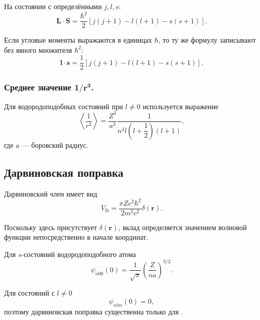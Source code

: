 \documentclass[../final.tex]{subfiles}
\begin{document}
На состоянии с определёнными $j,l,s$:
%
\begin{equation*}
    \mathbf L\cdot\mathbf S
    =
    \frac{\hbar^2}{2}
    \left[
        j(j+1)
        -
        l(l+1)
        -
        s(s+1)
    \right].
\end{equation*}

Если угловые моменты выражаются в единицах $\hbar$, то ту же формулу
записывают без явного множителя $\hbar^2$:
%
\begin{equation*}
    \mathbf l\cdot\mathbf s
    =
    \frac{1}{2}
    \left[
        j(j+1)
        -
        l(l+1)
        -
        s(s+1)
    \right].
\end{equation*}


\medskip
\subsubsection{Среднее значение $\boldsymbol{1/r^3}$.}

Для водородоподобных состояний при $l\neq0$ используется выражение
%
\begin{equation*}
    \left\langle
        \frac{1}{r^3}
    \right\rangle
    =
    \frac{Z^3}{a^3}
    \frac{1}{
        n^3
        l
        \left(l+\dfrac12\right)
        (l+1)
    },
\end{equation*}
%
где $a$ --- боровский радиус.


\subsection{Дарвиновская поправка}

Дарвиновский член имеет вид
%
\[
    V_{\mathrm D}
    =
    \frac{\pi Ze^2\hbar^2}{2m^2c^2}
    \delta(\mathbf r).
\]

Поскольку здесь присутствует $\delta(\mathbf r)$, вклад определяется
значением волновой функции непосредственно в начале координат.

Для $s$-состояний водородоподобного атома
%
\begin{equation*}
    \psi_{n00}(0)
    =
    \frac{1}{\sqrt{\pi}}
    \left(
        \frac{Z}{na}
    \right)^{3/2}.
\end{equation*}

Для состояний с $l\neq0$
%
\begin{equation*}
    \psi_{nlm}(0)=0,
\end{equation*}
%
поэтому дарвиновская поправка существенна только для
.
\end{document}
